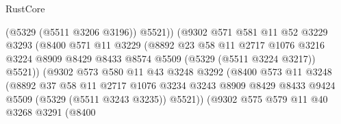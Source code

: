\begin{lexlean}{RustCore}
\begin{coremodule}
                                  (@5329 (@5511 @3206 @3196))
                                  @5521))
                              (@9302
                                @571
                                @581
                                @11
                                @52
                                @3229
                                @3293
                                (@8400
                                  @571
                                  @11
                                  @3229
                                  (@8892
                                    @23
                                    @58
                                    @11
                                    @2717
                                    @1076
                                    @3216
                                    @3224
                                    @8909
                                    @8429
                                    @8433
                                    @8574
                                    @5509
                                    (@5329 (@5511 @3224 @3217))
                                    @5521))
                                (@9302
                                  @573
                                  @580
                                  @11
                                  @43
                                  @3248
                                  @3292
                                  (@8400
                                    @573
                                    @11
                                    @3248
                                    (@8892
                                      @37
                                      @58
                                      @11
                                      @2717
                                      @1076
                                      @3234
                                      @3243
                                      @8909
                                      @8429
                                      @8433
                                      @9424
                                      @5509
                                      (@5329 (@5511 @3243 @3235))
                                      @5521))
                                  (@9302
                                    @575
                                    @579
                                    @11
                                    @40
                                    @3268
                                    @3291
                                    (@8400

\end{coremodule}
\end{lexlean}
